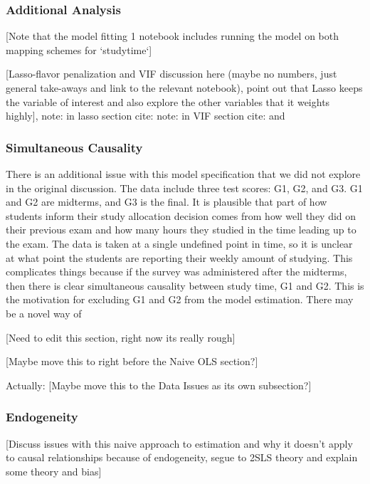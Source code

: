 \documentclass[12pt]{article}
\begin{document}
\subsubsection{Additional Analysis}
\textcolor{BrickRed}{[Note that the model fitting 1 notebook includes running the model on both mapping schemes for `studytime`]}

\textcolor{BrickRed}{[Lasso-flavor penalization and VIF discussion here (maybe no numbers, just general take-aways and link to the relevant notebook), point out that Lasso keeps the variable of interest and also explore the other variables that it weights highly]}, note: in lasso section cite: \cite{MLmetrics}  
note: in VIF section cite: \cite{VIF} and \cite{detecting}

\subsubsection{Simultaneous Causality}
There is an additional issue with this model specification that we did not explore in the original discussion. The data include three test scores: G1, G2, and G3. G1 and G2 are midterms, and G3 is the final. It is plausible that part of how students inform their study allocation decision comes from how well they did on their previous exam and how many hours they studied in the time leading up to the exam. The data is taken at a single undefined point in time, so it is unclear at what point the students are reporting their weekly amount of studying. This complicates things because if the survey was administered after the midterms, then there is clear simultaneous causality between study time, G1 and G2. This is the motivation for excluding G1 and G2 from the model estimation. There may be a novel way of 

\textcolor{BrickRed}{[Need to edit this section, right now its really rough]}

\textcolor{BrickRed}{[Maybe move this to right before the Naive OLS section?]}

Actually: \textcolor{BrickRed}{[Maybe move this to the Data Issues as its own subsection?]}

\subsubsection{Endogeneity}
\textcolor{BrickRed}{[Discuss issues with this naive approach to estimation and why it doesn't apply to causal relationships because of endogeneity, segue to 2SLS theory and explain some theory and bias]}
\end{document}
